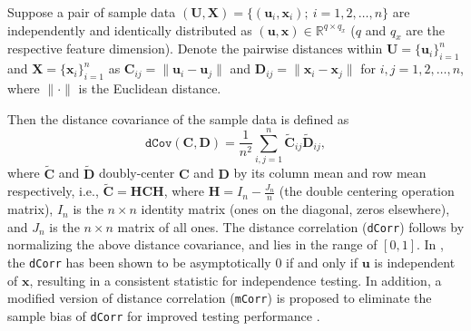 \documentclass[11pt]{article}
\theoremstyle{definition}
\begin{document}
Suppose a pair of sample data $(\mathbf{U}, \mathbf{X}) = \{  (\mathbf{u}_{i}, \mathbf{x}_{i} );~i = 1,2, \ldots, n \}$ are independently and identically distributed as $(\mathbf{u},\mathbf{x}) \in \mathbb{R}^{q \times q_x}$ ($q$ and $q_x$ are the respective feature dimension). Denote the pairwise distances within $\mathbf{U}=\{\mathbf{u}_{i}\}_{i=1}^{n}$ and $\mathbf{X}=\{\mathbf{x}_{i}\}_{i=1}^{n}$ as $\mathbf{C}_{ij} = \| \mathbf{u}_{i} - \mathbf{u}_{j} \|$ and $\mathbf{D}_{ij} = \| \mathbf{x}_{i} - \mathbf{x}_{j} \|$ for $i,j=1,2, \ldots , n$, where $\| \cdot \|$ is the Euclidean distance.

Then the distance covariance of the sample data is defined as 
\begin{equation}	 
\label{eq:dCov}
\texttt{dCov}(\mathbf{C}, \mathbf{D}) = \frac{1}{n^2} \sum\limits_{i,j=1}^{n} \tilde{\mathbf{C}}_{ij} \tilde{\mathbf{D}}_{ij},
\end{equation}
where $\tilde{\mathbf{C}}$ and $\tilde{\mathbf{D}}$ doubly-center $\mathbf{C}$ and $\mathbf{D}$ by its column mean and row mean respectively, i.e., $\tilde{\mathbf{C}}=\mathbf{H}\mathbf{C}\mathbf{H}$, where $\mathbf{H}=I_{n}-\frac{J_{n}}{n}$ (the double centering operation matrix), $I_n$ is the $n \times n$ identity matrix (ones on the diagonal, zeros elsewhere), and $J_n$ is the $n \times n$ matrix of all ones. The distance correlation (\texttt{dCorr}) follows by normalizing the above distance covariance, and lies in the range of $[0,1]$. In \cite{szekely2007measuring}, the \texttt{dCorr} has been shown to be asymptotically $0$ if and only if $\mathbf{u}$ is independent of $\mathbf{x}$, resulting in a consistent statistic for independence testing. In addition, a modified version of distance correlation (\texttt{mCorr}) is proposed to eliminate the sample bias of \texttt{dCorr} for improved testing performance \cite{szekely2013distance, SzekelyRizzo2014}.
\end{document}
